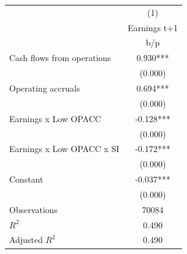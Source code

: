 {
\def\sym#1{\ifmmode^{#1}\else\(^{#1}\)\fi}
\begin{tabular}{l*{1}{c}}
\hline\hline
                    &\multicolumn{1}{c}{(1)}\\
                    &\multicolumn{1}{c}{Earnings t+1}\\
                    &         b/p   \\
\hline
Cash flows from operations&       0.930***\\
                    &     (0.000)   \\
Operating accruals  &       0.694***\\
                    &     (0.000)   \\
Earnings x Low OPACC&      -0.128***\\
                    &     (0.000)   \\
Earnings x Low OPACC x SI&      -0.172***\\
                    &     (0.000)   \\
Constant            &      -0.037***\\
                    &     (0.000)   \\
\hline
Observations        &       70084   \\
\(R^{2}\)           &       0.490   \\
Adjusted \(R^{2}\)  &       0.490   \\
\hline\hline
\end{tabular}
}
